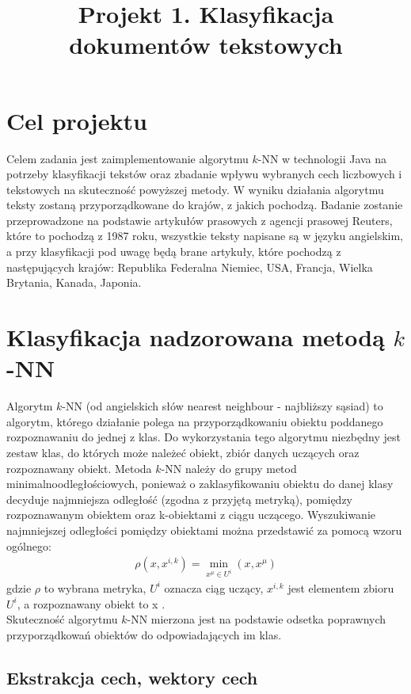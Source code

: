 \documentclass{classrep}
\author{
  \studentinfo{Hubert Gawłowski}{224298} \and
  \studentinfo{Kamil Kiszko-Zgierski}{224328} }
\title{Projekt 1. Klasyfikacja dokumentów tekstowych}
\begin{document}
\maketitle

\section{Cel projektu}

Celem zadania jest zaimplementowanie algorytmu $k$-NN w technologii Java na potrzeby klasyfikacji tekstów
oraz zbadanie wpływu wybranych cech liczbowych i tekstowych na skuteczność powyższej metody. W wyniku działania algorytmu teksty zostaną przyporządkowane do krajów, z jakich pochodzą.
Badanie zostanie przeprowadzone na podstawie artykułów prasowych z agencji prasowej Reuters, które to pochodzą z 1987 roku, wszystkie teksty napisane są w języku angielskim, a przy klasyfikacji pod uwagę będą brane artykuły, które pochodzą z następujących krajów: Republika Federalna Niemiec, USA, Francja, Wielka Brytania, Kanada, Japonia.  \\


\section{Klasyfikacja nadzorowana metodą $k$-NN}
Algorytm $k$-NN (od angielskich słów nearest neighbour - najbliższy sąsiad) to algorytm, 
którego działanie polega na przyporządkowaniu obiektu poddanego rozpoznawaniu do jednej z klas.
 Do wykorzystania tego algorytmu niezbędny jest zestaw klas, do których może należeć obiekt, zbiór danych uczących oraz rozpoznawany obiekt.
Metoda $k$-NN należy do grupy metod minimalnoodległościowych, ponieważ o zaklasyfikowaniu obiektu 
do danej klasy decyduje najmniejsza odległość (zgodna z przyjętą metryką), pomiędzy rozpoznawanym obiektem oraz k-obiektami z ciągu uczącego. 
Wyszukiwanie najmniejszej odległości pomiędzy obiektami można przedstawić za pomocą wzoru ogólnego:
\begin{gather}
\rho(x, x ^ {i, k})= \min_{x^\mu \in U^i}(x, x^\mu)
\end{gather}
\indent gdzie $\rho$ to wybrana metryka, $U^i$ oznacza ciąg uczący, $x^{i, k}$ jest elementem zbioru $U^i$, a rozpoznawany obiekt to x \cite{tadeusiewicz90}.\\
\indent Skuteczność algorytmu $k$-NN  mierzona jest na podstawie odsetka poprawnych przyporządkowań obiektów do odpowiadających im klas. 


\subsection{Ekstrakcja cech, wektory cech}
\end{document}
